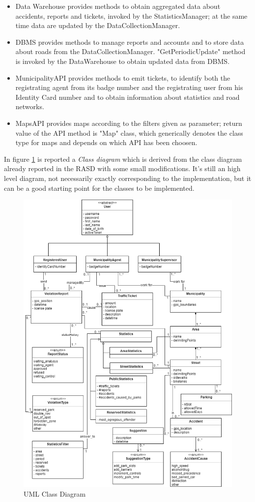 \documentclass[a4paper]{report}
\begin{document}
\begin{itemize}
\item Data Warehouse provides methods to obtain aggregated data about accidents, reports and tickets, invoked by the StatisticsManager; at the same time data are updated by the DataCollectionManager.
\item DBMS provides methods to manage reports and accounts and to store data about roads from the DataCollectionManager. "GetPeriodicUpdate" method is invoked by the DataWarehouse to obtain updated data from DBMS.
\item MunicipalityAPI provides methods to emit tickets, to identify both the registrating agent from its badge number and the registrating user from his Identity Card number and to obtain information about statistics and road networks.
\item MapsAPI provides maps according to the filters given as parameter; return value of the API method is "Map" class, which generically denotes the class type for maps and depends on which API has been choosen.
\end{itemize}
In figure \ref{fig:class-diagram} is reported a \textit{Class diagram} which is derived from the class diagram already reported in the RASD with some small modifications. It's still an high level diagram, not necessarily exactly corresponding to the implementation, but it can be a good starting point for the classes to be implemented.
\begin{figure}[htp]
\includegraphics[width=\textwidth]{ClassDiagramDD}
\caption{UML Class Diagram}
\label{fig:class-diagram}
\end{figure}
\restoregeometry
\end{document}
